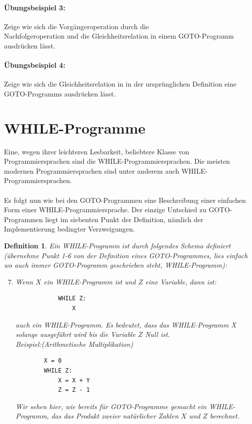 \documentclass[11pt,a4paper,leqno]{report}
\newtheorem{definition}[theorem]{Definition}
\numberwithin{equation}{chapter}
\begin{document}
\paragraph{\"Ubungsbeispiel 3:} Zeige wie sich die Vorg\"angeroperation durch die\\ Nachfolgeroperation und die Gleichheitsrelation in einem GOTO-Programm ausdr\"ucken l\"asst.
\paragraph{\"Ubungsbeispiel 4:} Zeige wie sich die Gleichheitsrelation in in der urspr\"unglichen Definition eine GOTO-Programms ausdr\"ucken l\"asst.
\section{WHILE-Programme}
Eine, wegen ihrer leichteren Lesbarkeit, beliebtere Klasse von Programmiersprachen sind die WHILE-Programmiersprachen. Die meisten modernen Programmiersprachen sind unter anderem auch WHILE-Programmiersprachen.\\
\\
Es folgt nun wie bei den GOTO-Programmen eine Beschreibung einer einfachen Form einer WHILE-Programmiersprache. Der einzige Untschied zu GOTO-Programmen liegt im siebenten Punkt der Definition, n\"amlich der Implementierung bedingter Verzweigungen.
\begin{definition}
	Ein WHILE-Programm ist durch folgendes Schema definiert (\"ubernehme Punkt 1-6 von der Definition eines GOTO-Programmes, lies einfach wo auch immer GOTO-Programm geschrieben steht, WHILE-Programm):
	\begin{enumerate}
 		\setcounter{enumi}{6}
		\item Wenn $X$ ein WHILE-Programm ist und $Z$ eine Variable, dann ist: 
		\begin{lstlisting}
			WHILE Z:
			    X
		\end{lstlisting}
		auch ein WHILE-Programm. Es bedeutet, dass das WHILE-Programm X solange ausgef\"uhrt wird bis die Variable $Z$ Null ist.\\
		Beispiel:(Arithmetische Multiplikation)
		\begin{lstlisting}
		X = 0
		WHILE Z:
		    X = X + Y
		    Z = Z - 1
		\end{lstlisting}	
		Wir sehen hier, wie bereits f\"ur GOTO-Programme gemacht ein WHILE-Programm, das das Produkt zweier nat\"urlicher Zahlen $X$ und $Z$ berechnet. 
	\end{enumerate}
\end{definition}
\end{document}
